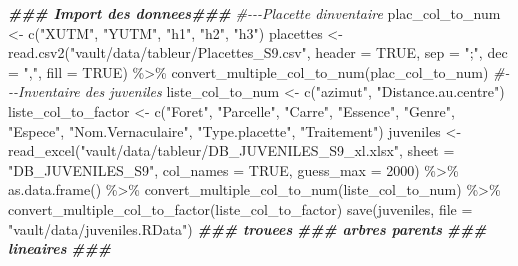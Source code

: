\documentclass[
  12pt,
  american,
  a4paper,
  extrafontsizes,onecolumn,openright
  ]{memoir}
\newenvironment{Shaded}{\begin{snugshade}}{\end{snugshade}}
\newcommand{\AttributeTok}[1]{\textcolor[rgb]{0.77,0.63,0.00}{#1}}
\newcommand{\CommentTok}[1]{\textcolor[rgb]{0.56,0.35,0.01}{\textit{#1}}}
\newcommand{\ConstantTok}[1]{\textcolor[rgb]{0.00,0.00,0.00}{#1}}
\newcommand{\DecValTok}[1]{\textcolor[rgb]{0.00,0.00,0.81}{#1}}
\newcommand{\DocumentationTok}[1]{\textcolor[rgb]{0.56,0.35,0.01}{\textbf{\textit{#1}}}}
\newcommand{\FunctionTok}[1]{\textcolor[rgb]{0.00,0.00,0.00}{#1}}
\newcommand{\NormalTok}[1]{#1}
\newcommand{\OtherTok}[1]{\textcolor[rgb]{0.56,0.35,0.01}{#1}}
\newcommand{\SpecialCharTok}[1]{\textcolor[rgb]{0.00,0.00,0.00}{#1}}
\newcommand{\StringTok}[1]{\textcolor[rgb]{0.31,0.60,0.02}{#1}}
\begin{document}
\normalsize

\scriptsize

\begin{Shaded}
\begin{Highlighting}[]
\DocumentationTok{\#\#\# Import des donnees\#\#\#}
\CommentTok{\#{-}{-}{-}Placette d\textquotesingle{}inventaire}
\NormalTok{plac\_col\_to\_num }\OtherTok{\textless{}{-}} \FunctionTok{c}\NormalTok{(}\StringTok{"XUTM"}\NormalTok{, }\StringTok{"YUTM"}\NormalTok{, }\StringTok{"h1"}\NormalTok{, }\StringTok{"h2"}\NormalTok{, }\StringTok{"h3"}\NormalTok{)}
\NormalTok{placettes }\OtherTok{\textless{}{-}} \FunctionTok{read.csv2}\NormalTok{(}\StringTok{"vault/data/tableur/Placettes\_S9.csv"}\NormalTok{,}
    \AttributeTok{header =} \ConstantTok{TRUE}\NormalTok{, }\AttributeTok{sep =} \StringTok{";"}\NormalTok{, }\AttributeTok{dec =} \StringTok{","}\NormalTok{, }\AttributeTok{fill =} \ConstantTok{TRUE}\NormalTok{) }\SpecialCharTok{\%\textgreater{}\%}
    \FunctionTok{convert\_multiple\_col\_to\_num}\NormalTok{(plac\_col\_to\_num)}
\CommentTok{\#{-}{-}{-}Inventaire des juveniles}
\NormalTok{liste\_col\_to\_num }\OtherTok{\textless{}{-}} \FunctionTok{c}\NormalTok{(}\StringTok{"azimut"}\NormalTok{, }\StringTok{"Distance.au.centre"}\NormalTok{)}
\NormalTok{liste\_col\_to\_factor }\OtherTok{\textless{}{-}} \FunctionTok{c}\NormalTok{(}\StringTok{"Foret"}\NormalTok{, }\StringTok{"Parcelle"}\NormalTok{, }\StringTok{"Carre"}\NormalTok{, }\StringTok{"Essence"}\NormalTok{,}
    \StringTok{"Genre"}\NormalTok{, }\StringTok{"Espece"}\NormalTok{, }\StringTok{"Nom.Vernaculaire"}\NormalTok{, }\StringTok{"Type.placette"}\NormalTok{, }\StringTok{"Traitement"}\NormalTok{)}
\NormalTok{juveniles }\OtherTok{\textless{}{-}} \FunctionTok{read\_excel}\NormalTok{(}\StringTok{"vault/data/tableur/DB\_JUVENILES\_S9\_xl.xlsx"}\NormalTok{,}
    \AttributeTok{sheet =} \StringTok{"DB\_JUVENILES\_S9"}\NormalTok{, }\AttributeTok{col\_names =} \ConstantTok{TRUE}\NormalTok{, }\AttributeTok{guess\_max =} \DecValTok{2000}\NormalTok{) }\SpecialCharTok{\%\textgreater{}\%}
    \FunctionTok{as.data.frame}\NormalTok{() }\SpecialCharTok{\%\textgreater{}\%}
    \FunctionTok{convert\_multiple\_col\_to\_num}\NormalTok{(liste\_col\_to\_num) }\SpecialCharTok{\%\textgreater{}\%}
    \FunctionTok{convert\_multiple\_col\_to\_factor}\NormalTok{(liste\_col\_to\_factor)}
\FunctionTok{save}\NormalTok{(juveniles, }\AttributeTok{file =} \StringTok{"vault/data/juveniles.RData"}\NormalTok{)}
\DocumentationTok{\#\#\# trouees}
\DocumentationTok{\#\#\# arbres parents}
\DocumentationTok{\#\#\# lineaires}
\DocumentationTok{\#\#\#}
\end{Highlighting}
\end{Shaded}
\end{document}
